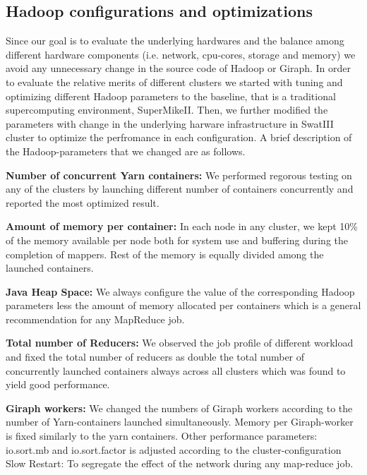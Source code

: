 \documentclass[conference]{IEEEtran}
\begin{document}
\subsection {Hadoop configurations and optimizations} \label{HadoopConfigurationsAndoptimizations}
Since our goal is to evaluate the underlying hardwares and the balance among different hardware components (i.e. network, cpu-cores, storage and memory) we avoid any unnecessary change in the source code of Hadoop or Giraph. 
In order to evaluate the relative merits of different clusters we started with tuning and optimizing different Hadoop parameters to the baseline, that is a traditional supercomputing environment, SuperMikeII. Then, we further modified the parameters with change in the underlying harware infrastructure in SwatIII cluster to optimize the perfromance in each configuration.
A brief description of the Hadoop-parameters that we changed are as follows.
  
\textbf{Number of concurrent Yarn containers:} We performed regorous testing on any of the clusters by launching different number of containers concurrently and reported the most optimized result.

\textbf{Amount of memory per container:} In each node in any cluster, we kept 10\% of the memory available per node both for system use and buffering during the completion of mappers. Rest of the memory is equally divided among the launched containers.

\textbf{Java Heap Space:} We always configure the value of the corresponding Hadoop parameters less the amount of memory allocated per containers which is a general recommendation for any MapReduce job.

\textbf{Total number of Reducers:} We observed the job profile of different workload and fixed the total number of reducers as double the total number of concurrently launched containers always across all clusters which was found to yield good performance. 

\textbf{Giraph workers:} We changed the numbers of Giraph workers according to the number of Yarn-containers launched simultaneously. Memory per Giraph-worker is fixed similarly to the yarn containers.
Other performance parameters: io.sort.mb and io.sort.factor is adjusted according to the cluster-configuration
Slow Restart: To segregate the effect of the network during any map-reduce job.
\end{document}

